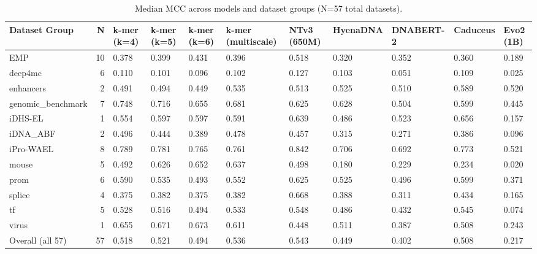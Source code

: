 \begin{table}[!h]
\centering
\small
\caption{Median MCC across models and dataset groups (N=57 total datasets).}
\label{tab:summary-mcc}
\begin{tabular}{lrlllllllll}
\toprule
Dataset Group & N & k-mer (k=4) & k-mer (k=5) & k-mer (k=6) & k-mer (multiscale) & NTv3 (650M) & HyenaDNA & DNABERT-2 & Caduceus & Evo2 (1B) \\
\midrule
EMP & 10 & 0.378 & 0.399 & 0.431 & 0.396 & 0.518 & 0.320 & 0.352 & 0.360 & 0.189 \\
deep4mc & 6 & 0.110 & 0.101 & 0.096 & 0.102 & 0.127 & 0.103 & 0.051 & 0.109 & 0.025 \\
enhancers & 2 & 0.491 & 0.494 & 0.449 & 0.535 & 0.513 & 0.525 & 0.510 & 0.589 & 0.520 \\
genomic_benchmark & 7 & 0.748 & 0.716 & 0.655 & 0.681 & 0.625 & 0.628 & 0.504 & 0.599 & 0.445 \\
iDHS-EL & 1 & 0.554 & 0.597 & 0.597 & 0.591 & 0.639 & 0.486 & 0.523 & 0.656 & 0.157 \\
iDNA_ABF & 2 & 0.496 & 0.444 & 0.389 & 0.478 & 0.457 & 0.315 & 0.271 & 0.386 & 0.096 \\
iPro-WAEL & 8 & 0.789 & 0.781 & 0.765 & 0.761 & 0.842 & 0.706 & 0.692 & 0.773 & 0.521 \\
mouse & 5 & 0.492 & 0.626 & 0.652 & 0.637 & 0.498 & 0.180 & 0.229 & 0.234 & 0.020 \\
prom & 6 & 0.590 & 0.535 & 0.493 & 0.552 & 0.625 & 0.525 & 0.496 & 0.599 & 0.371 \\
splice & 4 & 0.375 & 0.382 & 0.375 & 0.382 & 0.668 & 0.388 & 0.311 & 0.434 & 0.165 \\
tf & 5 & 0.528 & 0.516 & 0.494 & 0.533 & 0.548 & 0.486 & 0.432 & 0.545 & 0.074 \\
virus & 1 & 0.655 & 0.671 & 0.673 & 0.611 & 0.448 & 0.511 & 0.387 & 0.508 & 0.243 \\
Overall (all 57) & 57 & 0.518 & 0.521 & 0.494 & 0.536 & 0.543 & 0.449 & 0.402 & 0.508 & 0.217 \\
\bottomrule
\end{tabular}
\end{table}
